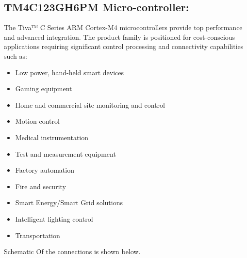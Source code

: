 \documentclass[a4paper,10pt,oneside]{article}
\begin{document}
{	\subsection{\huge \textbf{TM4C123GH6PM Micro-controller:}}
	{The Tiva™ C Series ARM Cortex-M4 microcontrollers provide top performance and advanced
		integration. The product family is positioned for cost-conscious applications requiring significant
		control processing and connectivity capabilities such as:
		\begin{itemize}
		\item Low power, hand-held smart devices
		\item Gaming equipment
		\item Home and commercial site monitoring and control
		\item Motion control
		\item Medical instrumentation
		\item Test and measurement equipment
		\item	Factory automation
		\item Fire and security
		\item  Smart Energy/Smart Grid solutions
		\item Intelligent lighting control
		\item Transportation
	\end{itemize}
	Schematic Of the connections is shown below.}
	\begin{center}

\end{center}}
\end{document}

